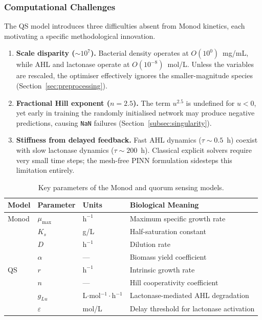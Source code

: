 \documentclass[14pt,a4paper,openany]{extbook}
\begin{document}
\subsubsection{Computational Challenges}
\label{subsubsec:qs_challenges}

The QS model introduces three difficulties absent from Monod kinetics, each
motivating a specific methodological innovation.

\begin{enumerate}
    \item \textbf{Scale disparity ($\sim$$10^{7}$).}
    Bacterial density operates at $O(10^{0})$~mg/mL, while AHL and
    lactonase operate at $O(10^{-8})$~mol/L.  Unless the variables are
    rescaled, the optimiser effectively ignores the smaller-magnitude
    species (Section~\ref{sec:preprocessing}).

    \item \textbf{Fractional Hill exponent ($n = 2.5$).}
    The term $u^{2.5}$ is undefined for $u < 0$, yet early in training the
    randomly initialised network may produce negative predictions, causing
    \texttt{NaN} failures (Section~\ref{subsec:singularity}).

    \item \textbf{Stiffness from delayed feedback.}
    Fast AHL dynamics ($\tau \sim 0.5$~h) coexist with slow lactonase
    dynamics ($\tau \sim 200$~h).  Classical explicit solvers require
    very small time steps; the mesh-free PINN formulation sidesteps this
    limitation entirely.
\end{enumerate}

\begin{table}[hbt]
\centering
\caption{Key parameters of the Monod and quorum sensing models.}
\label{tab:model_parameters}
\begin{tabular}{llll}
\toprule
\textbf{Model} & \textbf{Parameter} & \textbf{Units}
    & \textbf{Biological Meaning} \\
\midrule
Monod & $\mu_{\max}$  & $\mathrm{h}^{-1}$
    & Maximum specific growth rate \\
      & $K_s$         & g/L
    & Half-saturation constant \\
      & $D$           & $\mathrm{h}^{-1}$
    & Dilution rate \\
      & $\alpha$      & ---
    & Biomass yield coefficient \\
\midrule
QS    & $r$           & $\mathrm{h}^{-1}$
    & Intrinsic growth rate \\
      & $n$           & ---
    & Hill cooperativity coefficient \\
      & $g_{Lu}$
    & L$\cdot$mol$^{-1}\cdot$h$^{-1}$
    & Lactonase-mediated AHL degradation \\
      & $\varepsilon$ & mol/L
    & Delay threshold for lactonase activation \\
\bottomrule
\end{tabular}
\end{table}
\end{document}
